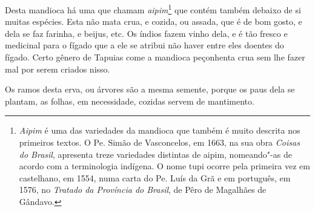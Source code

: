  Desta mandioca há uma que chamam \textit{aipim}\footnote{ \textit{Aipim} 
é uma das variedades da mandioca que também é muito
descrita nos primeiros textos. O Pe. Simão de Vasconcelos, em 1663, na
sua obra \textit{Coisas do Brasil}, apresenta treze variedades
distintas de aipim, nomeando"-as de acordo com a terminologia indígena.
O nome tupi ocorre pela primeira vez em castelhano, em 1554, numa
carta do Pe. Luís da Grã e em português, em 1576, no
\textit{Tratado da Província do Brasil}, de Pêro de Magalhães de Gândavo.} 
 que contém também debaixo de si muitas espécies. Esta não mata crua, e
cozida, ou assada, que é de bom gosto, e dela se faz farinha, e beijus,
etc. Os índios fazem vinho dela, e é tão fresco e medicinal para o
fígado que a ele se atribui não haver entre eles doentes do fígado.
Certo gênero de Tapuias come a mandioca peçonhenta crua sem lhe fazer
mal por serem criados nisso.

 Os ramos desta erva, ou árvores são a mesma semente, porque os paus
dela se plantam, as folhas, em necessidade, cozidas servem de mantimento. 

